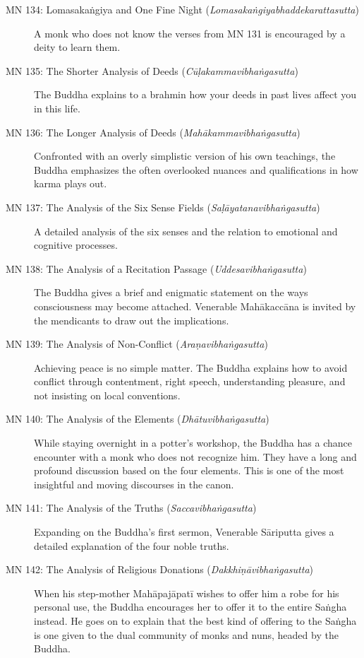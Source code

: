 \documentclass[12pt,openany]{book}%
\begin{document}
\begin{description}
\item[MN 134: \textsanskrit{Lomasakaṅgiya} and One Fine Night (\textit{\textsanskrit{Lomasakaṅgiyabhaddekarattasutta}})] A monk who does not know the verses from MN 131 is encouraged by a deity to learn them.%
\item[MN 135: The Shorter Analysis of Deeds (\textit{\textsanskrit{Cūḷakammavibhaṅgasutta}})] The Buddha explains to a brahmin how your deeds in past lives affect you in this life.%
\item[MN 136: The Longer Analysis of Deeds (\textit{\textsanskrit{Mahākammavibhaṅgasutta}})] Confronted with an overly simplistic version of his own teachings, the Buddha emphasizes the often overlooked nuances and qualifications in how karma plays out.%
\item[MN 137: The Analysis of the Six Sense Fields (\textit{\textsanskrit{Saḷāyatanavibhaṅgasutta}})] A detailed analysis of the six senses and the relation to emotional and cognitive processes.%
\item[MN 138: The Analysis of a Recitation Passage (\textit{\textsanskrit{Uddesavibhaṅgasutta}})] The Buddha gives a brief and enigmatic statement on the ways consciousness may become attached. Venerable \textsanskrit{Mahākaccāna} is invited by the mendicants to draw out the implications.%
\item[MN 139: The Analysis of Non-Conflict (\textit{\textsanskrit{Araṇavibhaṅgasutta}})] Achieving peace is no simple matter. The Buddha explains how to avoid conflict through contentment, right speech, understanding pleasure, and not insisting on local conventions.%
\item[MN 140: The Analysis of the Elements (\textit{\textsanskrit{Dhātuvibhaṅgasutta}})] While staying overnight in a potter’s workshop, the Buddha has a chance encounter with a monk who does not recognize him. They have a long and profound discussion based on the four elements. This is one of the most insightful and moving discourses in the canon.%
\item[MN 141: The Analysis of the Truths (\textit{\textsanskrit{Saccavibhaṅgasutta}})] Expanding on the Buddha’s first sermon, Venerable \textsanskrit{Sāriputta} gives a detailed explanation of the four noble truths.%
\item[MN 142: The Analysis of Religious Donations (\textit{\textsanskrit{Dakkhiṇāvibhaṅgasutta}})] When his step-mother \textsanskrit{Mahāpajāpatī} wishes to offer him a robe for his personal use, the Buddha encourages her to offer it to the entire \textsanskrit{Saṅgha} instead. He goes on to explain that the best kind of offering to the \textsanskrit{Saṅgha} is one given to the dual community of monks and nuns, headed by the Buddha.%

\end{description}
\end{document}
